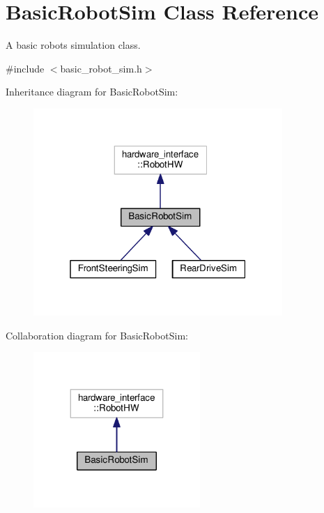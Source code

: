 \hypertarget{classBasicRobotSim}{}\section{Basic\+Robot\+Sim Class Reference}
\label{classBasicRobotSim}


A basic robot\textquotesingle{}s simulation class.  




{\ttfamily \#include $<$basic\+\_\+robot\+\_\+sim.\+h$>$}



Inheritance diagram for Basic\+Robot\+Sim\+:
\nopagebreak
\begin{figure}[H]
\begin{center}
\leavevmode
\includegraphics[width=268pt]{classBasicRobotSim__inherit__graph}
\end{center}
\end{figure}


Collaboration diagram for Basic\+Robot\+Sim\+:
\nopagebreak
\begin{figure}[H]
\begin{center}
\leavevmode
\includegraphics[width=179pt]{classBasicRobotSim__coll__graph}
\end{center}
\end{figure}
